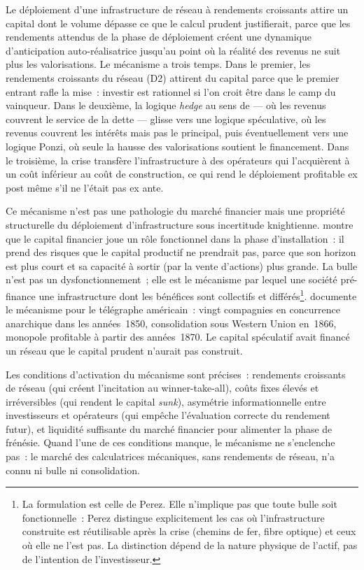 Le déploiement d'une infrastructure de réseau à rendements croissants attire un capital dont le volume dépasse ce que le calcul prudent justifierait, parce que les rendements attendus de la phase de déploiement créent une dynamique d'anticipation auto-réalisatrice jusqu'au point où la réalité des revenus ne suit plus les valorisations. Le mécanisme a trois temps. Dans le premier, les rendements croissants du réseau (D2) attirent du capital parce que le premier entrant rafle la mise~: investir est rationnel si l'on croit être dans le camp du vainqueur. Dans le deuxième, la logique \emph{hedge} au sens de \textcite{minsky_stabilizing_1986} --- où les revenus couvrent le service de la dette --- glisse vers une logique spéculative, où les revenus couvrent les intérêts mais pas le principal, puis éventuellement vers une logique Ponzi, où seule la hausse des valorisations soutient le financement. Dans le troisième, la crise transfère l'infrastructure à des opérateurs qui l'acquièrent à un coût inférieur au coût de construction, ce qui rend le déploiement profitable ex post même s'il ne l'était pas ex ante.

Ce mécanisme n'est pas une pathologie du marché financier mais une propriété structurelle du déploiement d'infrastructure sous incertitude knightienne. \textcite{perez_technological_2002} montre que le capital financier joue un rôle fonctionnel dans la phase d'installation~: il prend des risques que le capital productif ne prendrait pas, parce que son horizon est plus court et sa capacité à sortir (par la vente d'actions) plus grande. La bulle n'est pas un dysfonctionnement~; elle est le mécanisme par lequel une société pré-finance une infrastructure dont les bénéfices sont collectifs et différés\footnote{La formulation est celle de Perez. Elle n'implique pas que toute bulle soit fonctionnelle~: Perez distingue explicitement les cas où l'infrastructure construite est réutilisable après la crise (chemins de fer, fibre optique) et ceux où elle ne l'est pas. La distinction dépend de la nature physique de l'actif, pas de l'intention de l'investisseur.}. \textcite{nonnenmacher_telegraph_2001} documente le mécanisme pour le télégraphe américain~: vingt compagnies en concurrence anarchique dans les années~1850, consolidation sous Western Union en~1866, monopole profitable à partir des années~1870. Le capital spéculatif avait financé un réseau que le capital prudent n'aurait pas construit.

Les conditions d'activation du mécanisme sont précises~: rendements croissants de réseau (qui créent l'incitation au winner-take-all), coûts fixes élevés et irréversibles (qui rendent le capital \emph{sunk}), asymétrie informationnelle entre investisseurs et opérateurs (qui empêche l'évaluation correcte du rendement futur), et liquidité suffisante du marché financier pour alimenter la phase de frénésie. Quand l'une de ces conditions manque, le mécanisme ne s'enclenche pas~: le marché des calculatrices mécaniques, sans rendements de réseau, n'a connu ni bulle ni consolidation.

